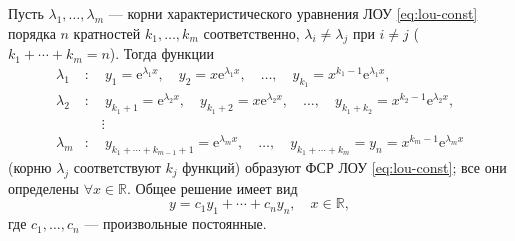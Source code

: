 \documentclass[12pt,a4paper]{article}
\numberwithin{equation}{section}
\newcommand{\R}{\mathbb{R}}
\newcommand{\e}{\mathrm{e}}
\begin{document}
\begin{theoremHSE}
Пусть \(\lambda_1,\ldots,\lambda_m\) --- корни характеристического уравнения ЛОУ \eqref{eq:lou-const} порядка \(n\) кратностей \(k_1,\ldots,k_m\) соответственно, \(\lambda_i\neq\lambda_j\) при \(i\neq j\) (\(k_1+\cdots+k_m=n\)). Тогда функции
\begin{equation}
\begin{aligned}
\lambda_1&:\quad y_1=\e^{\lambda_1x},\quad y_2=x\e^{\lambda_1x},\quad\ldots,\quad y_{k_1}=x^{k_1-1}\e^{\lambda_1x},\\
\lambda_2&:\quad y_{k_1+1}=\e^{\lambda_2x},\quad y_{k_1+2}=x\e^{\lambda_2x},\quad\ldots,\quad y_{k_1+k_2}=x^{k_2-1}\e^{\lambda_2x},\\
&\quad\ \vdots\\
\lambda_m&:\quad y_{k_1+\cdots+k_{m-1}+1}=\e^{\lambda_mx},\quad\ldots,\quad y_{k_1+\cdots+k_m}=y_n=x^{k_m-1}\e^{\lambda_mx}
\end{aligned}
\label{eq:fsr-multiple}
\end{equation}
(корню \(\lambda_j\) соответствуют \(k_j\) функций) образуют ФСР ЛОУ \eqref{eq:lou-const}; все они определены \(\forall x\in\R\). Общее решение имеет вид
\[
y=c_1y_1+\cdots+c_ny_n,\quad x\in\R,
\]
где \(c_1,\ldots,c_n\) --- произвольные постоянные.
\end{theoremHSE}
\end{document}
